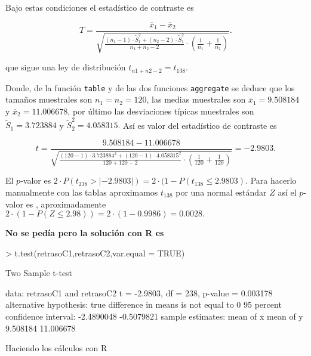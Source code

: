 \documentclass[10pt]{article}
\renewcommand{\leq}{\leqslant}
\begin{document}
{Bajo estas condiciones el estadístico de contraste es

$$T=\frac{\overline{x}_1-\overline{x}_2}{\sqrt{\frac{(n_1-1)\cdot \tilde{S}_1^2+(n_2-2)\cdot \tilde{S}_1^2}{n_1+n_2-2}\cdot 
\left(\frac{1}{n_1}+\frac{1}{n_2}\right)}}.$$

que sigue una ley de distribución $t_{n1+n2-2}=t_{138}.$

Donde, de la función \texttt{table} y de las dos funciones \texttt{aggregate} se deduce   que los tamaños muestrales son 
$n_1=n_2=120$, las medias muestrales son $\overline{x}_1=9.508184$ y $\overline{x}_2=11.006678$, por último las desviaciones típicas muestrales son $\tilde{S}_1=3.723884$ y   $\tilde{S}_2^2=4.058315.$ Así es valor del estadístico de contraste es

$$t=\frac{9.508184-11.006678}{\sqrt{\frac{(120-1)\cdot 3.723884^2+(120-1)\cdot 4.058315^2}{120+120-2} \cdot \left(\frac{1}{120}+\frac{1}{120}\right)}}=-2.9803.$$




El $p$-valor es $2\cdot P(t_{238}>|-2.9803|)=2\cdot (1-P(t_138\leq2.9803).$ Para hacerlo manualmente con las tablas aproximamos $t_{138}$ por una normal estándar $Z$ así el $p$-valor es , aproximadamente $2\cdot (1-P(Z\leq2.98))=2\cdot (1-0.9986)=0.0028.$


\textbf{No se pedía pero la solución con R es}


\begin{Schunk}
\begin{Sinput}
> t.test(retrasoC1,retrasoC2,var.equal = TRUE)
\end{Sinput}
\begin{Soutput}
	Two Sample t-test

data:  retrasoC1 and retrasoC2
t = -2.9803, df = 238, p-value = 0.003178
alternative hypothesis: true difference in means is not equal to 0
95 percent confidence interval:
 -2.4890048 -0.5079821
sample estimates:
mean of x mean of y 
 9.508184 11.006678 
\end{Soutput}
\end{Schunk}

Haciendo los cálculos con R

}
\end{document}
